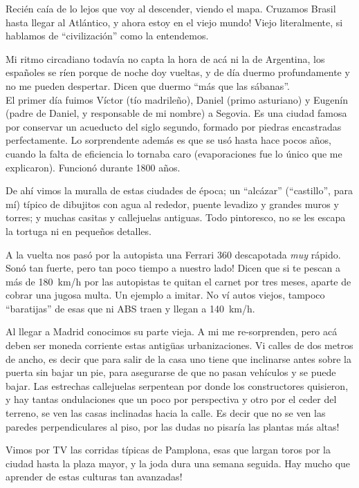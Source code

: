 Reci\'en ca\'ia de lo lejos que voy al descender, viendo el mapa. Cruzamos
Brasil hasta llegar al Atl\'antico, \textexclamdown y ahora estoy en el viejo
mundo! Viejo literalmente, si hablamos de ``civilizaci\'on'' como la
entendemos.

Mi ritmo circadiano todav\'ia no capta la hora de ac\'a ni la de Argentina,
los espa\~noles se r\'ien porque de noche doy vueltas, y de d\'ia duermo
profundamente y no me pueden despertar. Dicen que duermo ``m\'as que las
s\'abanas''.\\

El primer d\'ia fuimos V\'ictor (t\'io madrile\~no), Daniel (primo asturiano)
y Eugen\'in (padre de Daniel, y responsable de mi nombre) a Segovia. Es una
ciudad famosa por conservar un acueducto del siglo segundo, formado por
piedras encastradas perfectamente. Lo sorprendente adem\'as es que se us\'o
hasta hace pocos a\~nos, cuando la falta de eficiencia lo tornaba caro
(evaporaciones fue lo \'unico que me explicaron). Funcion\'o durante 1800
a\~nos.

De ah\'i vimos la muralla de estas ciudades de \'epoca; un ``alc\'azar''
(``castillo'', para m\'i) t\'ipico de dibujitos con agua al rededor, puente
levadizo y grandes muros y torres; y muchas casitas y callejuelas antiguas.
Todo pintoresco, no se les escapa la tortuga ni en peque\~nos detalles.

A la vuelta nos pas\'o por la autopista una Ferrari 360 descapotada \emph{muy}
r\'apido. \textexclamdown Son\'o tan fuerte, pero tan poco tiempo a nuestro
lado! Dicen que si te pescan a m\'as de 180~km/h por las autopistas te quitan
el carnet por tres meses, aparte de cobrar una jugosa multa. Un ejemplo a
imitar. No v\'i autos viejos, tampoco ``baratijas'' de esas que ni {\small
ABS} traen y llegan a 140~km/h.

Al llegar a Madrid conocimos su parte vieja. A mi me re-sorprenden, pero ac\'a
deben ser moneda corriente estas antig\"uas urbanizaciones. Vi calles de dos
metros de ancho, es decir que para salir de la casa uno tiene que inclinarse
antes sobre la puerta sin bajar un pie, para asegurarse de que no pasan
veh\'iculos y se puede bajar. Las estrechas callejuelas serpentean por donde
los constructores quisieron, y hay tantas ondulaciones que un poco por
perspectiva y otro por el ceder del terreno, se ven las casas inclinadas hacia
la calle. Es decir que no se ven las paredes perpendiculares al piso,
\textexclamdown por las dudas no pisar\'ia las plantas m\'as altas!

Vimos por {\small TV} las corridas t\'ipicas de Pamplona, esas que largan
toros por la ciudad hasta la plaza mayor, y la joda dura una semana seguida.
\textexclamdown Hay mucho que aprender de estas culturas tan avanzadas!\\

